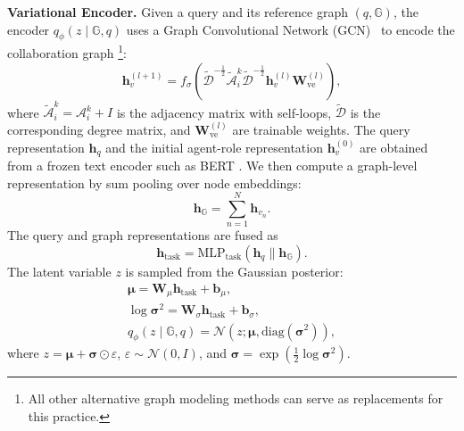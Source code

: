 \documentclass[lettersize,journal]{IEEEtran}
\theoremstyle{plain}
\begin{document}
\noindent\textbf{Variational Encoder.}
Given a query and its reference graph $(q,\mathbb{G})$, the encoder $q_\phi(z\mid \mathbb{G},q)$ uses a Graph Convolutional Network (GCN)~\cite{DBLP:conf/iclr/KipfW17} to encode the collaboration graph \footnote{All other alternative graph modeling methods can serve as replacements for this practice.}:
\begin{equation}
\mathbf{h}_{v}^{(l+1)}
=
f_\sigma\!\left(
\tilde{\mathcal{D}}^{-\frac{1}{2}}
\tilde{\mathcal{A}}_i^{k}
\tilde{\mathcal{D}}^{-\frac{1}{2}}
\mathbf{h}_{v}^{(l)}
\mathbf{W}_{\mathrm{ve}}^{(l)}
\right),
\end{equation}
where $\tilde{\mathcal{A}}_i^{k}=\mathcal{A}_i^{k}+I$ is the adjacency matrix with self-loops, $\tilde{\mathcal{D}}$ is the corresponding degree matrix, and $\mathbf{W}_{\mathrm{ve}}^{(l)}$ are trainable weights. The query representation $\mathbf{h}_q$ and the initial agent-role representation $\mathbf{h}_{v}^{(0)}$ are obtained from a frozen text encoder such as BERT \cite{DBLP:conf/naacl/DevlinCLT19}. We then compute a graph-level representation by sum pooling over node embeddings:
\begin{equation}
\mathbf{h}_{\mathbb{G}}=\sum_{n=1}^{N}\mathbf{h}_{v_n}.
\end{equation}
The query and graph representations are fused as
\begin{equation}
\mathbf{h}_{\mathrm{task}}=\mathrm{MLP}_{\mathrm{task}}(\mathbf{h}_q \parallel \mathbf{h}_{\mathbb{G}}).
\end{equation}
The latent variable $z$ is sampled from the Gaussian posterior:
\begin{gather}
\boldsymbol{\mu}=\mathbf{W}_{\mu}\mathbf{h}_{\mathrm{task}}+\mathbf{b}_{\mu},\\
\log \boldsymbol{\sigma}^{2}=\mathbf{W}_{\sigma}\mathbf{h}_{\mathrm{task}}+\mathbf{b}_{\sigma},\\
q_\phi(z\mid \mathbb{G},q)=\mathcal{N}\!\left(z;\boldsymbol{\mu},\mathrm{diag}(\boldsymbol{\sigma}^{2})\right),
\end{gather}
where $z=\boldsymbol{\mu}+\boldsymbol{\sigma}\odot \varepsilon$, $\varepsilon\sim\mathcal{N}(0,I)$, and $\boldsymbol{\sigma}=\exp\!\left(\frac{1}{2}\log \boldsymbol{\sigma}^{2}\right)$.
\end{document}
